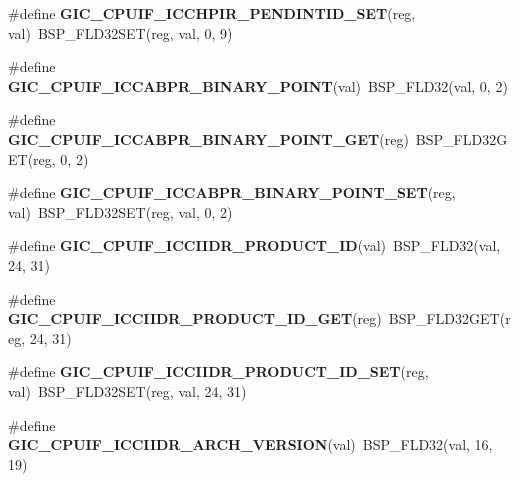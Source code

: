\begin{DoxyCompactItemize}
\#define {\bfseries G\+I\+C\+\_\+\+C\+P\+U\+I\+F\+\_\+\+I\+C\+C\+H\+P\+I\+R\+\_\+\+P\+E\+N\+D\+I\+N\+T\+I\+D\+\_\+\+S\+ET}(reg,  val)~B\+S\+P\+\_\+\+F\+L\+D32\+S\+ET(reg, val, 0, 9)
\item 
\mbox{\label{arm-gic-regs_8h_a029ceb02f8d27af64b503ba101373c5b}} 
\#define {\bfseries G\+I\+C\+\_\+\+C\+P\+U\+I\+F\+\_\+\+I\+C\+C\+A\+B\+P\+R\+\_\+\+B\+I\+N\+A\+R\+Y\+\_\+\+P\+O\+I\+NT}(val)~B\+S\+P\+\_\+\+F\+L\+D32(val, 0, 2)
\item 
\mbox{\label{arm-gic-regs_8h_ac21d4fc1c5f1225a8087ea21478520cd}} 
\#define {\bfseries G\+I\+C\+\_\+\+C\+P\+U\+I\+F\+\_\+\+I\+C\+C\+A\+B\+P\+R\+\_\+\+B\+I\+N\+A\+R\+Y\+\_\+\+P\+O\+I\+N\+T\+\_\+\+G\+ET}(reg)~B\+S\+P\+\_\+\+F\+L\+D32\+G\+ET(reg, 0, 2)
\item 
\mbox{\label{arm-gic-regs_8h_abe1dab8d43f0ced5385abab054f8c0de}} 
\#define {\bfseries G\+I\+C\+\_\+\+C\+P\+U\+I\+F\+\_\+\+I\+C\+C\+A\+B\+P\+R\+\_\+\+B\+I\+N\+A\+R\+Y\+\_\+\+P\+O\+I\+N\+T\+\_\+\+S\+ET}(reg,  val)~B\+S\+P\+\_\+\+F\+L\+D32\+S\+ET(reg, val, 0, 2)
\item 
\mbox{\label{arm-gic-regs_8h_a546f74b34a74d0a70bd37d08ddbd4beb}} 
\#define {\bfseries G\+I\+C\+\_\+\+C\+P\+U\+I\+F\+\_\+\+I\+C\+C\+I\+I\+D\+R\+\_\+\+P\+R\+O\+D\+U\+C\+T\+\_\+\+ID}(val)~B\+S\+P\+\_\+\+F\+L\+D32(val, 24, 31)
\item 
\mbox{\label{arm-gic-regs_8h_a8cfe631b1a557180e417cc9e91ac2e4a}} 
\#define {\bfseries G\+I\+C\+\_\+\+C\+P\+U\+I\+F\+\_\+\+I\+C\+C\+I\+I\+D\+R\+\_\+\+P\+R\+O\+D\+U\+C\+T\+\_\+\+I\+D\+\_\+\+G\+ET}(reg)~B\+S\+P\+\_\+\+F\+L\+D32\+G\+ET(reg, 24, 31)
\item 
\mbox{\label{arm-gic-regs_8h_a9795414107d41cc1abf38536731c0dbd}} 
\#define {\bfseries G\+I\+C\+\_\+\+C\+P\+U\+I\+F\+\_\+\+I\+C\+C\+I\+I\+D\+R\+\_\+\+P\+R\+O\+D\+U\+C\+T\+\_\+\+I\+D\+\_\+\+S\+ET}(reg,  val)~B\+S\+P\+\_\+\+F\+L\+D32\+S\+ET(reg, val, 24, 31)
\item 
\mbox{\label{arm-gic-regs_8h_aecd98a5c2dacd2be1df2911e88aad375}} 
\#define {\bfseries G\+I\+C\+\_\+\+C\+P\+U\+I\+F\+\_\+\+I\+C\+C\+I\+I\+D\+R\+\_\+\+A\+R\+C\+H\+\_\+\+V\+E\+R\+S\+I\+ON}(val)~B\+S\+P\+\_\+\+F\+L\+D32(val, 16, 19)

\end{DoxyCompactItemize}
